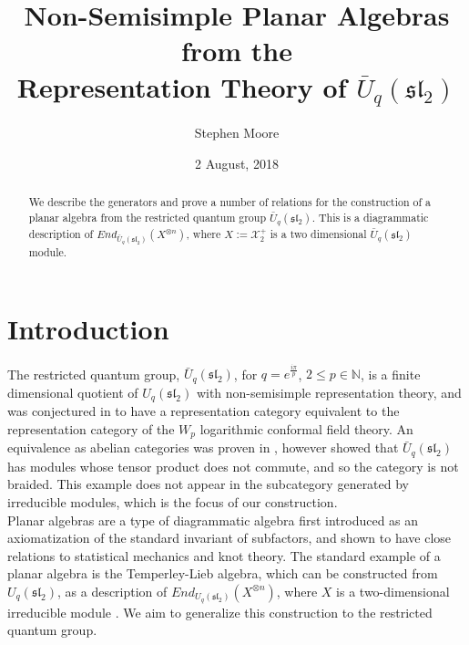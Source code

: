 \documentclass[]{article}
\title{Non-Semisimple Planar Algebras from the\\ Representation Theory of $\bar{U}_{q}(\mathfrak{sl}_{2})$}
\author{Stephen Moore \\
	\multicolumn{1}{p{.8\textwidth}}{\centering\emph{Dept. of Mathematics, Ben Gurion University, Beer-Sheva, Israel,\\ stm862@gmail.com}}}
\date{2 August, 2018}
\begin{document}
\maketitle

\begin{abstract}
We describe the generators and prove a number of relations for the construction of a planar algebra from the restricted quantum group $\bar{U}_{q}(\mathfrak{sl}_{2})$. This is a diagrammatic description of $End_{\bar{U}_{q}(\mathfrak{sl}_{2})}(X^{\otimes n})$, where $X:=\mathcal{X}^{+}_{2}$ is a two dimensional $\bar{U}_{q}(\mathfrak{sl}_{2})$ module. 
\end{abstract}
\let\thefootnote\relax{}
\section{Introduction}
The restricted quantum group, $\bar{U}_{q}(\mathfrak{sl}_{2})$, for $q=e^{\frac{i\pi}{p}}$, $2\leq p\in\mathbb{N}$, is a finite dimensional quotient of $U_{q}(\mathfrak{sl}_{2})$ with non-semisimple representation theory, and was conjectured in \cite{FGST3} to have a representation category equivalent to the representation category of the $W_{p}$ logarithmic conformal field theory. An equivalence as abelian categories was proven in \cite{NaTs2}, however \cite{KoSa} showed that $\bar{U}_{q}(\mathfrak{sl}_{2})$ has modules whose tensor product does not commute, and so the category is not braided. This example does not appear in the subcategory generated by irreducible modules, which is the focus of our construction.\\

Planar algebras are a type of diagrammatic algebra first introduced as an axiomatization of the standard invariant of subfactors, and shown to have close relations to statistical mechanics and knot theory. The standard example of a planar algebra is the Temperley-Lieb algebra, which can be constructed from $U_{q}(\mathfrak{sl}_{2})$, as a description of $End_{U_{q}(\mathfrak{sl}_{2})}(X^{\otimes n})$, where $X$ is a two-dimensional irreducible module \cite{FrKhov, Martin}. We aim to generalize this construction to the restricted quantum group.\\
\end{document}
